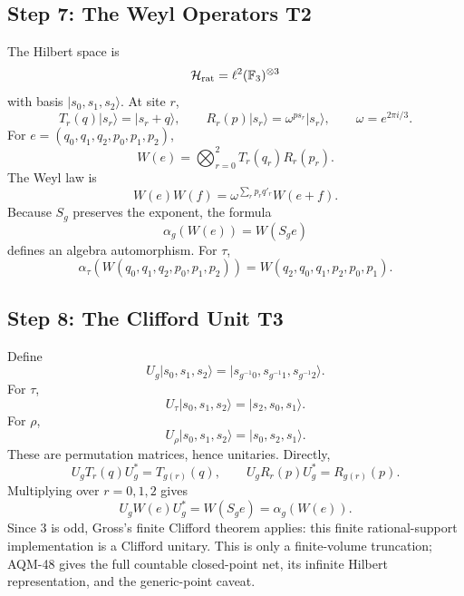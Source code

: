 \subsection{Step 7: The Weyl Operators T2}
The Hilbert space is
\[
  \mathcal H_{\rm rat}=
  \ell^2(\mathbb F_3)^{\otimes3}
\]
with basis \(|s_0,s_1,s_2\rangle\).  At site \(r\),
\[
  T_r(q)|s_r\rangle=|s_r+q\rangle,\qquad
  R_r(p)|s_r\rangle=\omega^{ps_r}|s_r\rangle,
  \qquad \omega=e^{2\pi i/3}.
\]
For \(e=(q_0,q_1,q_2,p_0,p_1,p_2)\),
\[
  W(e)=\bigotimes_{r=0}^2T_r(q_r)R_r(p_r).
\]
The Weyl law is
\[
  W(e)W(f)=
  \omega^{\sum_r p_rq'_r}W(e+f).
\]
Because \(S_g\) preserves the exponent, the formula
\[
  \alpha_g(W(e))=W(S_ge)
\]
defines an algebra automorphism.  For \(\tau\),
\[
  \alpha_\tau(W(q_0,q_1,q_2,p_0,p_1,p_2))
  =
  W(q_2,q_0,q_1,p_2,p_0,p_1).
\]
\subsection{Step 8: The Clifford Unit T3}
Define
\[
  U_g|s_0,s_1,s_2\rangle
  =
  |s_{g^{-1}0},s_{g^{-1}1},s_{g^{-1}2}\rangle .
\]
For \(\tau\),
\[
  U_\tau|s_0,s_1,s_2\rangle=|s_2,s_0,s_1\rangle.
\]
For \(\rho\),
\[
  U_\rho|s_0,s_1,s_2\rangle=|s_0,s_2,s_1\rangle.
\]
These are permutation matrices, hence unitaries.  Directly,
\[
  U_gT_r(q)U_g^*=T_{g(r)}(q),
  \qquad
  U_gR_r(p)U_g^*=R_{g(r)}(p).
\]
Multiplying over \(r=0,1,2\) gives
\[
  U_gW(e)U_g^*=W(S_ge)=\alpha_g(W(e)).
\]
Since \(3\) is odd, Gross's finite Clifford theorem applies: this finite
rational-support implementation is a Clifford unitary.  This is only a
finite-volume truncation; AQM-48 gives the full countable closed-point net,
its infinite Hilbert representation, and the generic-point caveat.
